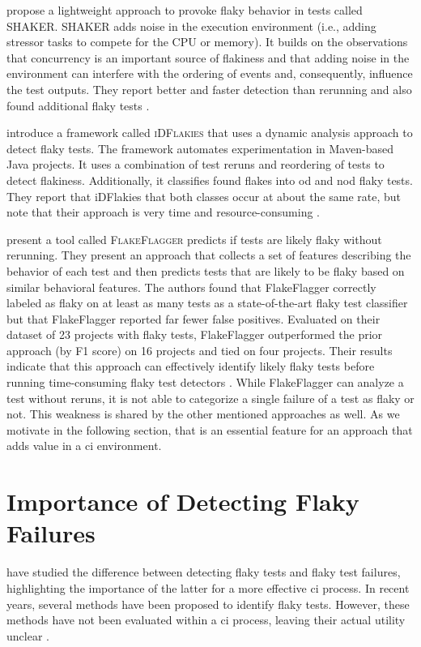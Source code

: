  propose a lightweight approach to provoke flaky behavior in tests called \textsc{SHAKER}.
SHAKER adds noise in the execution environment (i.e., adding stressor tasks to compete for the CPU or memory).
It builds on the observations that concurrency is an important source of flakiness and that adding noise in the environment can interfere with the ordering of events and, consequently, influence the test outputs.
They report better and faster detection than rerunning and also found additional flaky tests \autocite{silva_shake_2020}.

 introduce a framework called \textsc{iDFlakies} that uses a dynamic analysis approach to detect flaky tests.
The framework automates experimentation in Maven-based Java projects.
It uses a combination of test reruns and reordering of tests to detect flakiness.
Additionally, it classifies found flakes into \ac{od} and \ac{nod} flaky tests.
They report that iDFlakies that both classes occur at about the same rate, but note that their approach is very time and resource-consuming \autocite{lam_idflakies_2019}.

 present a tool called \textsc{FlakeFlagger} predicts if tests are likely flaky without rerunning.
They present an approach that collects a set of features describing the behavior of each test and then predicts tests that are likely to be flaky based on similar behavioral features.
The authors found that FlakeFlagger correctly labeled as flaky on at least as many tests as a state-of-the-art flaky test classifier but that FlakeFlagger reported far fewer false positives.
Evaluated on their dataset of 23 projects with flaky tests, FlakeFlagger outperformed the prior approach (by F1 score) on 16 projects and tied on four projects.
Their results indicate that this approach can effectively identify likely flaky tests before running time-consuming flaky test detectors \autocite{alshammari_flakeflagger_2021}.
While FlakeFlagger can analyze a test without reruns, it is not able to categorize a single failure of a test as flaky or not.
This weakness is shared by the other mentioned approaches as well.
As we motivate in the following section, that is an essential feature for an approach that adds value in a \ac{ci} environment.

\section{Importance of Detecting Flaky Failures}
 have studied the difference between detecting flaky tests and flaky test failures, highlighting the importance of the latter for a more effective \ac{ci} process.
In recent years, several methods have been proposed to identify flaky tests.
However, these methods have not been evaluated within a \ac{ci} process, leaving their actual utility unclear \autocite{haben_importance_2023}.

